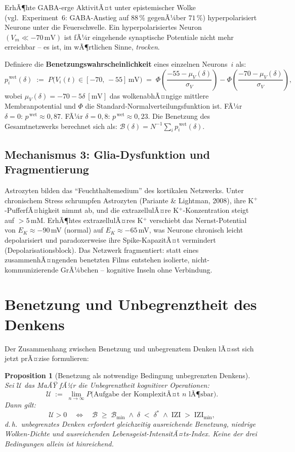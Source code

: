 ﻿\documentclass[12pt,a4paper]{report}
\theoremstyle{plain}
\newtheorem{proposition}[theorem]{Proposition}
\theoremstyle{definition}
\theoremstyle{remark}
\begin{document}
	ErhÃ¶hte GABA-erge AktivitÃ¤t unter epistemischer Wolke
	(vgl.\ Experiment~6: GABA-Anstieg auf $88\,\%$ gegenÃ¼ber $71\,\%$)
	hyperpolarisiert Neurone unter die Feuerschwelle.
	Ein hyperpolarisiertes Neuron $(V_m \ll -70\,\text{mV})$ ist
	fÃ¼r eingehende synaptische Potentiale nicht mehr erreichbar --
	es ist, im wÃ¶rtlichen Sinne, \emph{trocken}.

	Definiere die \textbf{Benetzungswahrscheinlichkeit} eines einzelnen
	Neurons~$i$ als:
	\[
	p_i^{\,\text{wet}}(\delta)
	\;:=\; P\bigl(V_i(t) \in [-70,\,-55]\,\text{mV}\bigr)
	\;=\; \Phi\!\left(\frac{-55 - \mu_V(\delta)}{\sigma_V}\right)
	-
	\Phi\!\left(\frac{-70 - \mu_V(\delta)}{\sigma_V}\right),
	\]
	wobei $\mu_V(\delta) = -70 - 5\delta \ [\text{mV}]$
	das wolkenabhÃ¤ngige mittlere Membranpotential und
	$\Phi$ die Standard-Normalverteilungsfunktion ist.
	FÃ¼r $\delta = 0$: $p^{\,\text{wet}} \approx 0{,}87$.
	FÃ¼r $\delta = 0{,}8$: $p^{\,\text{wet}} \approx 0{,}23$.
	Die Benetzung des Gesamtnetzwerks berechnet sich als:
	$\mathcal{B}(\delta) = N^{-1}\sum_i p_i^{\,\text{wet}}(\delta)$.

	\subsection{Mechanismus 3: Glia-Dysfunktion und Fragmentierung}

	Astrozyten bilden das ``Feuchthaltemedium'' des kortikalen Netzwerks.
	Unter chronischem Stress schrumpfen Astrozyten
	(Pariante \& Lightman, 2008), ihre K$^+$-PufferfÃ¤higkeit nimmt ab,
	und die extrazellulÃ¤re K$^+$-Konzentration steigt auf $> 5\,\text{mM}$.
	ErhÃ¶htes extrazellulÃ¤res K$^+$ verschiebt das Nernst-Potential von
	$E_K \approx -90$\,mV (normal) auf $E_K \approx -65$\,mV,
	was Neurone chronisch leicht depolarisiert und paradoxerweise
	ihre Spike-KapazitÃ¤t vermindert (Depolarisationsblock).
	Das Netzwerk fragmentiert: statt eines zusammenhÃ¤ngenden benetzten
	Films entstehen isolierte, nicht-kommunizierende GrÃ¼bchen --
	kognitive Inseln ohne Verbindung.

	\section{Benetzung und Unbegrenztheit des Denkens}

	Der Zusammenhang zwischen Benetzung und unbegrenztem Denken lÃ¤sst
	sich jetzt prÃ¤zise formulieren:

	\begin{proposition}[Benetzung als notwendige Bedingung unbegrenzten Denkens]
		\label{prop:unbegrenzt}
		Sei $\mathcal{U}$ das MaÃŸ fÃ¼r die Unbegrenztheit kognitiver Operationen:
		\[
		\mathcal{U} \;:=\;
		\lim_{n \to \infty} P\bigl(\text{Aufgabe der KomplexitÃ¤t } n
		\text{ lÃ¶sbar}\bigr).
		\]
		Dann gilt:
		\[
		\mathcal{U} > 0
		\quad\Longleftrightarrow\quad
		\mathcal{B} \;\geq\; \mathcal{B}_{\min}
		\;\wedge\;
		\delta \;<\; \delta^*
		\;\wedge\;
		\mathrm{IZI} \;>\; \mathrm{IZI}_{\min},
		\]
		d.\,h.\ unbegrenztes Denken erfordert \emph{gleichzeitig}
		ausreichende Benetzung, niedrige Wolken-Dichte
		\emph{und} ausreichenden Lebensgeist-IntensitÃ¤ts-Index.
		Keine der drei Bedingungen allein ist hinreichend.
	\end{proposition}
\end{document}

